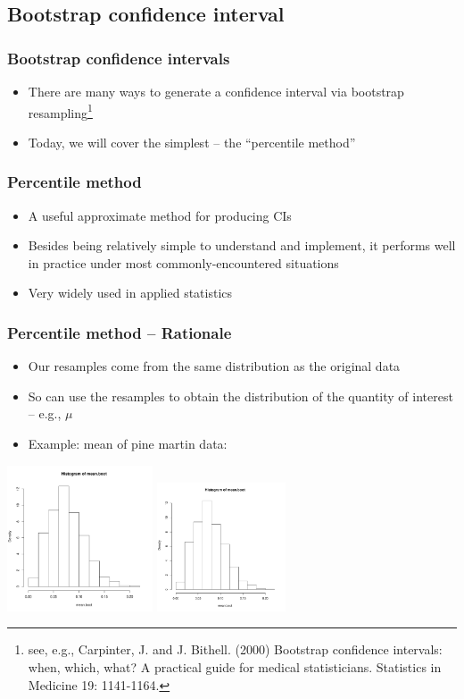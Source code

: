 \documentclass[a4paper,12pt]{article}
\newcommand{\bc}{\begin{center}}
\newcommand{\ec}{\end{center}}
\newcommand{\bi}{\begin{itemize}}
\newcommand{\ei}{\end{itemize}}
\begin{document}
\subsection{Bootstrap confidence interval}

\begin{frame}
    \frametitle{Bootstrap confidence intervals}
    \bi
        \item There are many ways to generate a confidence interval via bootstrap resampling\footnote{see, e.g., Carpinter, J. and J. Bithell. (2000) Bootstrap confidence intervals: when, which, what? A practical guide for medical statisticians. Statistics in Medicine 19: 1141-1164.}
        \item Today, we will cover the simplest -- the ``percentile method''
		\ei
\end{frame}


\begin{frame}
    \frametitle{Percentile method}
    \bi
        \item A useful approximate method for producing CIs
				\item Besides being relatively simple to understand and implement, it performs well in practice under most commonly-encountered situations
        \item Very widely used in applied statistics
    \ei
\end{frame}

\begin{frame}[fragile]
    \frametitle{Percentile method -- Rationale}
    \bi
        \item <1->Our resamples come from the same distribution as the original data
        \item <2->So can use the resamples to obtain the distribution of the quantity of interest -- e.g., $\mu$
        \item <3->Example: mean of pine martin data:
    \ei
     {\bc
          {\includegraphics[height=1.7in]{HistMeanBoot}}
          {\includegraphics[height=1.5in]{HistMeanBoot}}
    \ec}
\end{frame}
\end{document}
